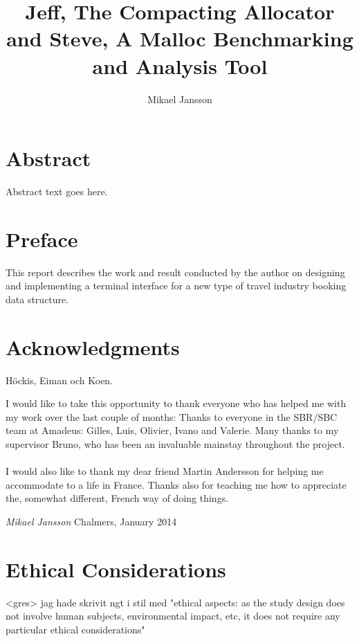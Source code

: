 \documentclass[a4paper,twoside,openany]{report}
\begin{document}
\title{Jeff, The Compacting Allocator and Steve, A Malloc Benchmarking and Analysis Tool}
\author{Mikael Jansson}




\chapter*{Abstract}
Abstract text goes here.

\clearpage
\chapter*{Preface}
This report describes the work and result conducted by the author on designing
and implementing a terminal interface for a new type of travel industry booking
data structure.

\clearpage
\tableofcontents

\clearpage
{}
\chapter*{Acknowledgments}
Höckis, Eiman och Koen.

I would like to take this opportunity to thank everyone who has helped me with
my work over the last couple of months: Thanks to everyone in the SBR/SBC team
at Amadeus: Gilles, Luis, Olivier, Ivano and Valerie. Many thanks to my
supervisor Bruno, who has been an invaluable mainstay throughout the project.
\\\\
I would also like to thank my dear friend Martin Andersson for helping me
accommodate to a life in France. Thanks also for teaching me how to appreciate
the, somewhat different, French way of doing things.

\vspace{3ex}

\noindent
\textit{Mikael Jansson}  Chalmers, January 2014


\clearpage


\chapter{Ethical Considerations}
<gres> jag hade skrivit ngt i stil med "ethical aspects: as the study design does not involve human subjects, environmental impact, etc, it does not require any particular ethical considerations"
\end{document}
